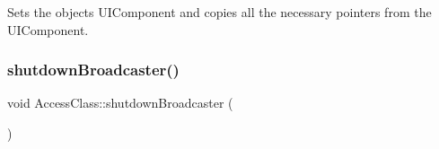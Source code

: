 Sets the object\textquotesingle{}s U\+I\+Component and copies all the necessary pointers from the U\+I\+Component. \mbox{\label{namespace_access_class_a7a20009ac4b41582f1379b6196f2c07c}} 
\subsubsection{\texorpdfstring{shutdown\+Broadcaster()}{shutdownBroadcaster()}}
{\footnotesize\ttfamily void Access\+Class\+::shutdown\+Broadcaster (\begin{DoxyParamCaption}{ }\end{DoxyParamCaption})}

